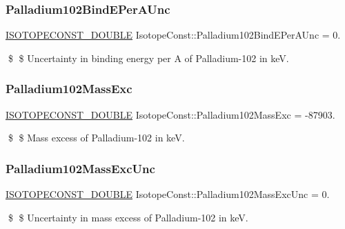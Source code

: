 \subsubsection{\texorpdfstring{Palladium102\+Bind\+E\+Per\+A\+Unc}{Palladium102BindEPerAUnc}}
{\footnotesize\ttfamily \mbox{\hyperlink{group___isotope_const-_macros_ga8f45a7272ce02c0b4c65c44636ed719a}{I\+S\+O\+T\+O\+P\+E\+C\+O\+N\+S\+T\+\_\+\+D\+O\+U\+B\+LE}} Isotope\+Const\+::\+Palladium102\+Bind\+E\+Per\+A\+Unc = 0.}

\$ \$ Uncertainty in binding energy per A of Palladium-\/102 in keV. \mbox{\label{group___isotope_const-_palladium-_pd102_ga1be6c2c035105f7c0929f0774373e208}} 
\subsubsection{\texorpdfstring{Palladium102\+Mass\+Exc}{Palladium102MassExc}}
{\footnotesize\ttfamily \mbox{\hyperlink{group___isotope_const-_macros_ga8f45a7272ce02c0b4c65c44636ed719a}{I\+S\+O\+T\+O\+P\+E\+C\+O\+N\+S\+T\+\_\+\+D\+O\+U\+B\+LE}} Isotope\+Const\+::\+Palladium102\+Mass\+Exc = -\/87903.}

\$ \$ Mass excess of Palladium-\/102 in keV. \mbox{\label{group___isotope_const-_palladium-_pd102_ga5cab572732ba3c627190b026c1811eb7}} 
\subsubsection{\texorpdfstring{Palladium102\+Mass\+Exc\+Unc}{Palladium102MassExcUnc}}
{\footnotesize\ttfamily \mbox{\hyperlink{group___isotope_const-_macros_ga8f45a7272ce02c0b4c65c44636ed719a}{I\+S\+O\+T\+O\+P\+E\+C\+O\+N\+S\+T\+\_\+\+D\+O\+U\+B\+LE}} Isotope\+Const\+::\+Palladium102\+Mass\+Exc\+Unc = 0.}

\$ \$ Uncertainty in mass excess of Palladium-\/102 in keV. \mbox{\label{group___isotope_const-_palladium-_pd102_gadf81a8bcf2ff440f6cb984a0db7c1244}} 

